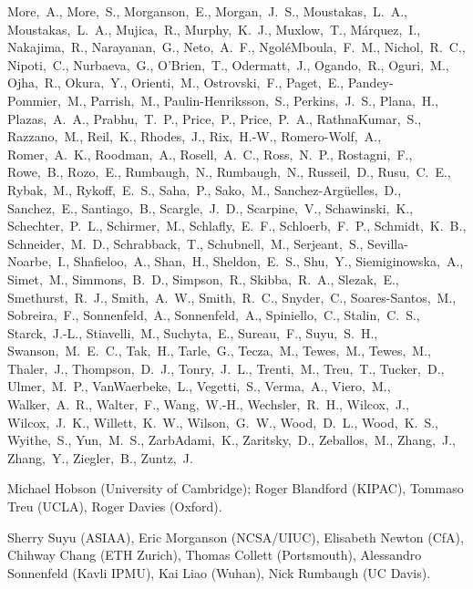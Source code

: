 More,~A.,
More,~S.,
Morganson,~E.,
Morgan,~J.~S.,
Moustakas,~L.~A.,
Moustakas,~L.~A.,
Mujica,~R.,
Murphy,~K.~J.,
Muxlow,~T.,
M\'{a}rquez,~I.,
Nakajima,~R.,
Narayanan,~G.,
Neto,~A.~F.,
Ngol\'{e}Mboula,~F.~M.,
Nichol,~R.~C.,
Nipoti,~C.,
Nurbaeva,~G.,
O'Brien,~T.,
Odermatt,~J.,
Ogando,~R.,
Oguri,~M.,
Ojha,~R.,
Okura,~Y.,
Orienti,~M.,
Ostrovski,~F.,
Paget,~E.,
Pandey-Pommier,~M.,
Parrish,~M.,
Paulin-Henriksson,~S.,
Perkins,~J.~S.,
Plana,~H.,
Plazas,~A.~A.,
Prabhu,~T.~P.,
Price,~P.,
Price,~P.~A.,
RathnaKumar,~S.,
Razzano,~M.,
Reil,~K.,
Rhodes,~J.,
Rix,~H.-W.,
Romero-Wolf,~A.,
Romer,~A.~K.,
Roodman,~A.,
Rosell,~A.~C.,
Ross,~N.~P.,
Rostagni,~F.,
Rowe,~B.,
Rozo,~E.,
Rumbaugh,~N.,
Rumbaugh,~N.,
Russeil,~D.,
Rusu,~C.~E.,
Rybak,~M.,
Rykoff,~E.~S.,
Saha,~P.,
Sako,~M.,
Sanchez-Arg\"{u}elles,~D.,
Sanchez,~E.,
Santiago,~B.,
Scargle,~J.~D.,
Scarpine,~V.,
Schawinski,~K.,
Schechter,~P.~L.,
Schirmer,~M.,
Schlafly,~E.~F.,
Schloerb,~F.~P.,
Schmidt,~K.~B.,
Schneider,~M.~D.,
Schrabback,~T.,
Schubnell,~M.,
Serjeant,~S.,
Sevilla-Noarbe,~I.,
Shafieloo,~A.,
Shan,~H.,
Sheldon,~E.~S.,
Shu,~Y.,
Siemiginowska,~A.,
Simet,~M.,
Simmons,~B.~D.,
Simpson,~R.,
Skibba,~R.~A.,
Slezak,~E.,
Smethurst,~R.~J.,
Smith,~A.~W.,
Smith,~R.~C.,
Snyder,~C.,
Soares-Santos,~M.,
Sobreira,~F.,
Sonnenfeld,~A.,
Sonnenfeld,~A.,
Spiniello,~C.,
Stalin,~C.~S.,
Starck,~J.-L.,
Stiavelli,~M.,
Suchyta,~E.,
Sureau,~F.,
Suyu,~S.~H.,
Swanson,~M.~E.~C.,
Tak,~H.,
Tarle,~G.,
Tecza,~M.,
Tewes,~M.,
Tewes,~M.,
Thaler,~J.,
Thompson,~D.~J.,
Tonry,~J.~L.,
Trenti,~M.,
Treu,~T.,
Tucker,~D.,
Ulmer,~M.~P.,
VanWaerbeke,~L.,
Vegetti,~S.,
Verma,~A.,
Viero,~M.,
Walker,~A.~R.,
Walter,~F.,
Wang,~W.-H.,
Wechsler,~R.~H.,
Wilcox,~J.,
Wilcox,~J.~K.,
Willett,~K.~W.,
Wilson,~G.~W.,
Wood,~D.~L.,
Wood,~K.~S.,
Wyithe,~S.,
Yun,~M.~S.,
ZarbAdami,~K.,
Zaritsky,~D.,
Zeballos,~M.,
Zhang,~J.,
Zhang,~Y.,
Ziegler,~B.,
Zuntz,~J.
\normalsize

\vspace{\baselineskip}

Michael Hobson (University of Cambridge);
Roger Blandford (KIPAC), Tommaso Treu (UCLA), Roger Davies (Oxford).

\vspace{\baselineskip}

Sherry Suyu (ASIAA), Eric Morganson (NCSA/UIUC), Elisabeth Newton (CfA),
Chihway Chang (ETH Zurich), Thomas Collett (Portsmouth), Alessandro Sonnenfeld (Kavli IPMU),
Kai Liao (Wuhan), Nick Rumbaugh (UC Davis).




